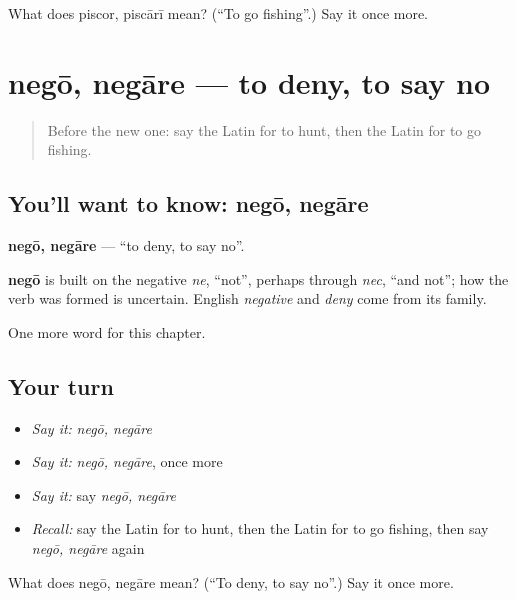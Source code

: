 \begin{tcolorbox}[breakable,colback=teal!4,colframe=teal!35!black,title={Before you move on}]
What does piscor, piscārī mean? (\textquotedblleft{}To go fishing\textquotedblright{}.) Say it once more.
\end{tcolorbox}
\section[negō, negāre]{negō, negāre — to deny, to say no}

\label{lesson:LA-C172-nego}



\begin{quote}
Before the new one: say the Latin for to hunt, then the Latin for to go fishing.
\end{quote}

\subsection*{You'll want to know: negō, negāre}
\textbf{negō, negāre} — \textquotedblleft{}to deny, to say no\textquotedblright{}.

\begin{cousinweb}
\textbf{negō} is built on the negative \emph{ne}, \textquotedblleft{}not\textquotedblright{}, perhaps through \emph{nec}, \textquotedblleft{}and not\textquotedblright{}; how the verb was formed is uncertain. English \emph{negative} and \emph{deny} come from its family.
\end{cousinweb}

\begin{grammarlens}[title={What you've built}]
One more word for this chapter.
\end{grammarlens}

\subsection*{Your turn}
\begin{itemize}
\raggedright
  \item \emph{Say it:} \emph{negō, negāre}
  \item \emph{Say it:} \emph{negō, negāre}, once more
  \item \emph{Say it:} say \emph{negō, negāre}
  \item \emph{Recall:} say the Latin for to hunt, then the Latin for to go fishing, then say \emph{negō, negāre} again
\end{itemize}

\begin{tcolorbox}[breakable,colback=teal!4,colframe=teal!35!black,title={Before you move on}]
What does negō, negāre mean? (\textquotedblleft{}To deny, to say no\textquotedblright{}.) Say it once more.
\end{tcolorbox}
